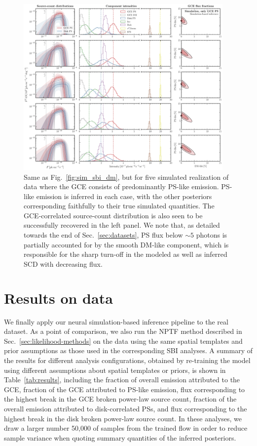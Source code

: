 \documentclass[prd,aps,10pt,nofootinbib,twocolumn,superscriptaddress,preprintnumbers,balancelastpage,longbibliography,floatfix]{revtex4-2}
\begin{document}
%
\begin{figure}
\centering
\includegraphics[width=0.95\textwidth]{plots/sim_sbi_ps.pdf}
\caption{Same as Fig.~\ref{fig:sim_sbi_dm}, but for five simulated realization of \Fermi data where the GCE consists of predominantly PS-like emission. PS-like emission is inferred in each case, with the other posteriors corresponding faithfully to their true simulated quantities. The GCE-correlated source-count distribution is also seen to be successfully recovered in the left panel. We note that, as detailed towards the end of Sec.~\ref{sec:datasets}, PS flux below $\sim 5$ photons is partially accounted for by the smooth DM-like component, which is responsible for the sharp turn-off in the modeled as well as inferred SCD with decreasing flux.}
\label{fig:sim_sbi_ps}
\end{figure}
%

\section{Results on \Fermi data}
\label{sec:data}

We finally apply our neural simulation-based inference pipeline to the real \Fermi dataset. As a point of comparison, we also run the NPTF method described in Sec.~\ref{sec:likelihood-methods} on the data using the same spatial templates and prior assumptions as those used in the corresponding SBI analyses. A summary of the results for different analysis configurations, obtained by re-training the model using different assumptions about spatial templates or priors, is shown in Table~\ref{tab:results}, including the fraction of overall emission attributed to the GCE, fraction of the GCE attributed to PS-like emission, flux corresponding to the highest break in the GCE broken power-law source count, fraction of the overall emission attributed to disk-correlated PSs, and flux corresponding to the highest break in the disk broken power-law source count. In these analyses, we draw a larger number 50,000 of samples from the trained flow in order to reduce sample variance when quoting summary quantities of the inferred posteriors.
\end{document}
